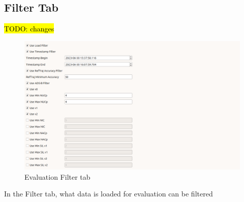 


\subsection{Filter Tab}

\hl{TODO: changes}

\begin{figure}[H]
  \hspace*{-2cm}
    \includegraphics[width=18cm,frame]{figures/eval_filter.png}
  \caption{Evaluation Filter tab}
\end{figure}

In the Filter tab, what data is loaded for evaluation can be filtered \\

